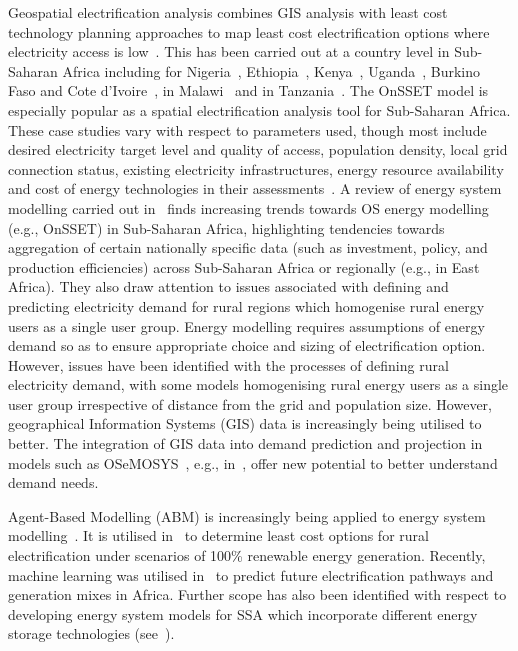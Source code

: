 \documentclass[conference, a4paper]{IEEEtran}
\begin{document}
Geospatial electrification analysis combines GIS analysis with least cost technology planning approaches to map least cost electrification options where electricity access is low~\cite{mentis-howells-ea-2017,trotter-cooper-ea-2019}. This has been carried out at a country level in Sub-Saharan Africa including for Nigeria~\cite{mentis-siyal-ea-2017,nerini-broad-ea-2016,mentis-welsch-ea-2015}, Ethiopia~\cite{mentis-andersson-ea-2016}, Kenya~\cite{mentis-howells-ea-2017,szabo-moner-girona-ea-2016,mentis-welsch-ea-2015}, Uganda~\cite{trotter-cooper-ea-2019}, Burkino Faso and Cote d’Ivoire~\cite{bissiri-moura-ea-2020}, in Malawi~\cite{korkovelos-khavari-ea-2019} and in Tanzania~\cite{menghwani-zerriffi-ea-2020}. The OnSSET model is especially popular as a spatial electrification analysis tool for Sub-Saharan Africa. These case studies vary with respect to parameters used, though most include desired electricity target level and quality of access, population density, local grid connection status, existing electricity infrastructures, energy resource availability and cost of energy technologies in their assessments~\cite{menghwani-zerriffi-ea-2020}. A review of energy system modelling carried out in~\cite{rocco-fumagalli-ea-2021} finds increasing trends towards OS energy modelling (e.g., OnSSET) in Sub-Saharan Africa, highlighting tendencies towards aggregation of certain nationally specific data (such as investment, policy, and production efficiencies) across Sub-Saharan Africa or regionally (e.g., in East Africa). They also draw attention to issues associated with defining and predicting electricity demand for rural regions which homogenise rural energy users as a single user group. Energy modelling requires assumptions of energy demand so as to ensure appropriate choice and sizing of electrification option. However, issues have been identified with the processes of defining rural electricity demand, with some models homogenising rural energy users as a single user group irrespective of distance from the grid and population size. However, geographical Information Systems (GIS) data is increasingly being utilised to better. The integration of GIS data into demand prediction and projection in models such as OSeMOSYS~\cite{howells-rogner-ea-2011}, e.g., in~\cite{rocco-fumagalli-ea-2021}, offer new potential to better understand demand needs.  

Agent-Based Modelling (ABM) is increasingly being applied to energy system modelling~\cite{alfaro-miller-2021,riva-colombo-2020}. It is utilised in~\cite{alfaro-miller-2021} to determine least cost options for rural electrification under scenarios of 100\% renewable energy generation. Recently, machine learning was utilised in~\cite{alova-trotter-ea-2021} to predict future electrification pathways and generation mixes in Africa. Further scope has also been identified with respect to developing energy system models for SSA which incorporate different energy storage technologies (see~\cite{musonye-davidsdottir-ea-2020}).
\end{document}
